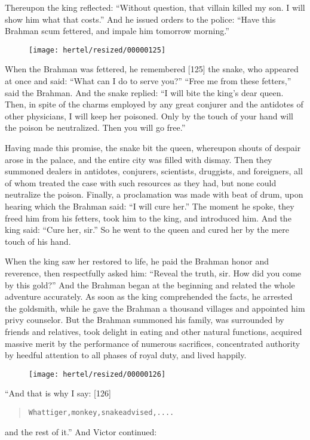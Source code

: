\documentclass[article, twoside, 10pt]{memoir}
\renewenvironment{verbatim}{%
\begin{quote}%
\vskip -10pt%
\begin{alltt}\normalfont\small}{\end{alltt}%
\end{quote}%
\vskip -10pt
} %
\begin{document}
Thereupon the king reflected:
``Without question, that villain killed my son. I will show him what that costs.''
And he issued orders to the police:
``Have this Brahman scum fettered, and impale him tomorrow morning.''

\begin{figure}[p]\texttt{[image: hertel/resized/00000125]}\end{figure}When the Brahman was fettered, he remembered [125] the snake, who
appeared at once and said: ``What can I do to serve you?''
``Free me from these fetters,'' said the Brahman. And the snake
replied:
``I will bite the king's dear queen. Then, in spite of the charms employed by any great conjurer and the antidotes of other physicians, I will keep her poisoned. Only by the touch of your hand will the poison be neutralized. Then you will go free.''

Having made this promise, the snake bit the queen, whereupon shouts
of despair arose in the palace, and the entire city was filled with
dismay. Then they summoned dealers in antidotes, conjurers,
scientists, druggists, and foreigners, all of whom treated the case
with such resources as they had, but none could neutralize the
poison. Finally, a proclamation was made with beat of drum, upon
hearing which the Brahman said: ``I will cure her.'' The moment he
spoke, they freed him from his fetters, took him to the king, and
introduced him. And the king said: ``Cure her, sir.'' So he went to
the queen and cured her by the mere touch of his hand.

When the king saw her restored to life, he paid the Brahman honor
and reverence, then respectfully asked him:
``Reveal the truth, sir. How did you come by this gold?'' And the
Brahman began at the beginning and related the whole adventure
accurately. As soon as the king comprehended the facts, he arrested
the goldsmith, while he gave the Brahman a thousand villages and
appointed him privy counselor. But the Brahman summoned his family,
was surrounded by friends and relatives, took delight in eating and
other natural functions, acquired massive merit by the performance
of numerous sacrifices, concentrated authority by heedful attention
to all phases of royal duty, and lived happily.

\begin{figure}[p]\texttt{[image: hertel/resized/00000126]}\end{figure}“And that is why I say: [126]

\begin{verbatim}
What tiger, monkey, snake advised, ....
\end{verbatim}
and the rest of it.” And Victor continued:
\end{document}
